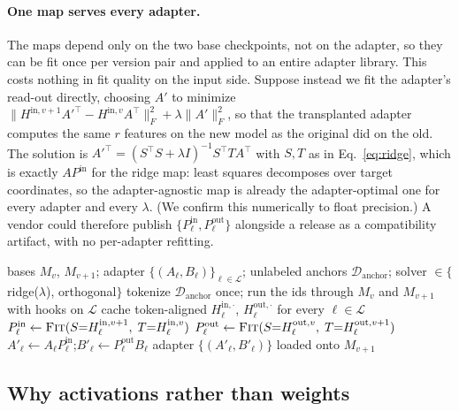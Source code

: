 \paragraph{One map serves every adapter.}
The maps depend only on the two base checkpoints, not on the adapter, so they
can be fit once per version pair and applied to an entire adapter library. This
costs nothing in fit quality on the input side. Suppose instead we fit the
adapter's read-out directly, choosing $A'$ to minimize
$\lVert H^{\mathrm{in},v+1}A'^\top-H^{\mathrm{in},v}A^\top\rVert_F^2+\lambda\lVert A'\rVert_F^2$,
so that the transplanted adapter computes the same $r$ features on the new
model as the original did on the old. The solution is
$A'^\top=(S^\top S+\lambda I)^{-1}S^\top TA^\top$ with $S,T$ as in
Eq.~\eqref{eq:ridge}, which is exactly $A P^{\mathrm{in}}$ for the ridge map:
least squares decomposes over target coordinates, so the adapter-agnostic map
is already the adapter-optimal one for every adapter and every $\lambda$. (We
confirm this numerically to float precision.) A vendor could therefore publish
$\{P^{\mathrm{in}}_\ell,P^{\mathrm{out}}_\ell\}$ alongside a release as a
compatibility artifact, with no per-adapter refitting.

\begin{algorithm}[t]
\caption{Activation-aligned adapter transplant}
\label{alg:transplant}
\begin{algorithmic}[1]
\Require bases $M_v$, $M_{v+1}$; adapter $\{(A_\ell,B_\ell)\}_{\ell\in\mathcal{L}}$;
         unlabeled anchors $\mathcal{D}_{\mathrm{anchor}}$; solver $\in\{$ridge($\lambda$), orthogonal$\}$
\State tokenize $\mathcal{D}_{\mathrm{anchor}}$ once; run the ids through $M_v$ and $M_{v+1}$ with hooks on $\mathcal{L}$
\State cache token-aligned $H^{\mathrm{in},\cdot}_\ell$, $H^{\mathrm{out},\cdot}_\ell$ for every $\ell\in\mathcal{L}$
  \State $P^{\mathrm{in}}_\ell\gets\textsc{Fit}(S{=}H^{\mathrm{in},v+1}_\ell,\;T{=}H^{\mathrm{in},v}_\ell)$ 
  \State $P^{\mathrm{out}}_\ell\gets\textsc{Fit}(S{=}H^{\mathrm{out},v}_\ell,\;T{=}H^{\mathrm{out},v+1}_\ell)$
  \State $A'_\ell\gets A_\ell P^{\mathrm{in}}_\ell$;\quad $B'_\ell\gets P^{\mathrm{out}}_\ell B_\ell$
\EndFor
\State \Return adapter $\{(A'_\ell,B'_\ell)\}$ loaded onto $M_{v+1}$
\end{algorithmic}
\end{algorithm}

\subsection{Why activations rather than weights}
\label{sec:method:why}

